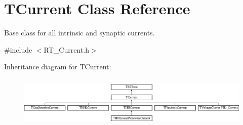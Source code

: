 \hypertarget{class_t_current}{\section{T\+Current Class Reference}
\label{class_t_current}
}


Base class for all intrinsic and synaptic currents.  




{\ttfamily \#include $<$R\+T\+\_\+\+Current.\+h$>$}

Inheritance diagram for T\+Current\+:\begin{figure}[H]
\begin{center}
\leavevmode
\includegraphics[height=2.461539cm]{class_t_current}
\end{center}
\end{figure}
